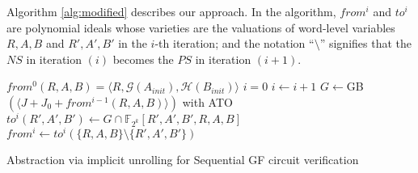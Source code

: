 Algorithm
\ref{alg:modified} describes our approach.  In the algorithm, $from^i$
and $to^i$ are polynomial ideals whose varieties are the valuations of
word-level variables $R, A, B$ and $R',A',B'$ in the $i$-th iteration;
and the notation ``$\setminus$'' signifies that the $NS$ in iteration
$(i)$ becomes the $PS$ in iteration $(i+1)$. 

\vspace{-0.1in}
\begin{algorithm}[hbt]
\SetAlgoNoLine

  $from^0(R,A,B) = \langle R, \mathcal{G}(A_{init}), \mathcal{H}(B_{init})\rangle$\;
  $i = 0$\;
  {
  	$i \gets i + 1$\;
	$G \gets$GB$( \langle J + J_0+ from^{i-1}(R,A,B) \rangle
    )$ with ATO\;
	$to^i(R',A',B')\gets G\cap \mathbb F_{2^k}[R',A',B',R,A,B]$\;
	$from^i \gets to^i(\{R,A,B\}\setminus \{R',A',B'\})$\;
  }
\caption {Abstraction via implicit unrolling for Sequential GF circuit
  verification}
\label{alg:modified}
\end{algorithm}

